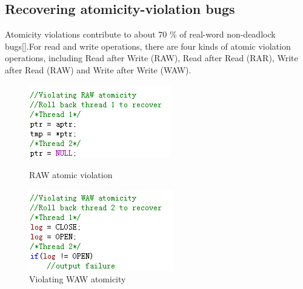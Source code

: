 \subsection{Recovering atomicity-violation bugs}
Atomicity violations contribute to about 70 \% of real-word non-deadlock bugs[].For read and write operations, there are four kinds of atomic violation operations, including Read after Write (RAW), Read after Read (RAR), Write after Read (RAW) and Write after Write (WAW). 
\begin{figure}
\begin{minipage}[t]{0.52\linewidth}
\centering
\includegraphics[width=\textwidth]{body/RAW.png}
\caption{RAW atomic violation}
\label {RAW}
\end{minipage}%
\begin{minipage}[t]{0.52\linewidth}
\centering
\includegraphics[width=\textwidth]{body/WAW.png}
\caption{Violating WAW atomicity}
\label{WAW}
\end{minipage}
\end{figure}

